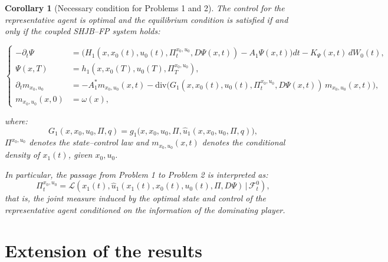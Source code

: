 \documentclass[12pt]{article}
\newtheorem{cor}[teo]{Corollary}
\theoremstyle{definition}
\begin{document}
\begin{cor}[Necessary condition for Problems 1 and 2]
\label{Condicion necesaria Problemas 1 y 2}
The control for the representative agent is optimal and the equilibrium condition is satisfied if and only if the coupled SHJB--FP system holds:

\[
\left\{
\begin{aligned}
    -\partial_t \Psi &= \Big( H_1(x, x_0(t), u_0(t), \Pi^{x_0,u_0}_t, D\Psi(x,t)) - A_1 \Psi(x,t) \Big) dt - K_\Psi(x,t) \, dW_0(t), \\
    \Psi(x,T) &= h_1 \left( x, x_0(T), u_0(T), \Pi^{x_0,u_0}_T \right), \\
    \partial_t m_{x_0,u_0} &= -A_1^* m_{x_0,u_0}(x,t) - \mathrm{div}\!\Big( G_1(x, x_0(t), u_0(t), \Pi^{x_0,u_0}_t, D\Psi(x,t))\, m_{x_0,u_0}(x,t)\Big), \\
    m_{x_0,u_0}(x,0) &= \omega(x),
\end{aligned}
\right.
\]

where:
\[
G_1(x,x_0,u_0,\Pi,q) = g_1\!\big(x, x_0, u_0,\Pi, \hat u_1(x, x_0, u_0, \Pi, q)\big),
\]
$\Pi^{x_0,u_0}$ denotes the state--control law and \(m_{x_0,u_0}(x,t)\) denotes the conditional density of \(x_1(t)\), given \(x_0,u_0\).

In particular, the passage from Problem 1 to Problem 2 is interpreted as:
\[
\Pi^{x_0,u_0}_t = \mathcal{L}\!\left( x_1(t), \hat u_1(x_1(t),x_0(t), u_0(t),\Pi,D\Psi)\,\big|\, \mathcal{F}_t^0 \right),
\]
that is, the joint measure induced by the optimal state and control of the representative agent conditioned on the information of the dominating player.
\end{cor}

\section{Extension of the results}
\end{document}
